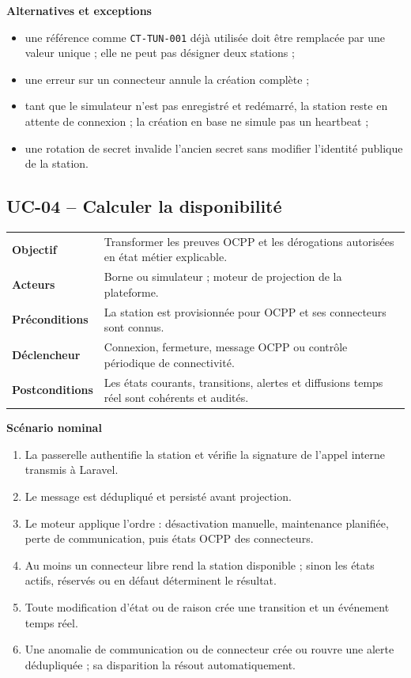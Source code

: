 \textbf{Alternatives et exceptions}
\begin{itemize}[leftmargin=7mm]
  \item une référence comme \texttt{CT-TUN-001} déjà utilisée doit être remplacée par
  une valeur unique ; elle ne peut pas désigner deux stations ;
  \item une erreur sur un connecteur annule la création complète ;
  \item tant que le simulateur n'est pas enregistré et redémarré, la station reste en
  attente de connexion ; la création en base ne simule pas un heartbeat ;
  \item une rotation de secret invalide l'ancien secret sans modifier l'identité
  publique de la station.
\end{itemize}

\subsection{UC-04 -- Calculer la disponibilité}

\begin{table}[H]
  \centering
  \begin{tabularx}{\textwidth}{@{}C{3.3cm}Y@{}}
    \toprule
    \textbf{Objectif} & Transformer les preuves OCPP et les dérogations autorisées en
    état métier explicable.\\
    \textbf{Acteurs} & Borne ou simulateur ; moteur de projection de la plateforme.\\
    \textbf{Préconditions} & La station est provisionnée pour OCPP et ses connecteurs
    sont connus.\\
    \textbf{Déclencheur} & Connexion, fermeture, message OCPP ou contrôle périodique
    de connectivité.\\
    \textbf{Postconditions} & Les états courants, transitions, alertes et diffusions
    temps réel sont cohérents et audités.\\
    \bottomrule
  \end{tabularx}
\end{table}

\textbf{Scénario nominal}
\begin{enumerate}[leftmargin=8mm]
  \item La passerelle authentifie la station et vérifie la signature de l'appel
  interne transmis à Laravel.
  \item Le message est dédupliqué et persisté avant projection.
  \item Le moteur applique l'ordre : désactivation manuelle, maintenance planifiée,
  perte de communication, puis états OCPP des connecteurs.
  \item Au moins un connecteur libre rend la station disponible ; sinon les états
  actifs, réservés ou en défaut déterminent le résultat.
  \item Toute modification d'état ou de raison crée une transition et un événement
  temps réel.
  \item Une anomalie de communication ou de connecteur crée ou rouvre une alerte
  dédupliquée ; sa disparition la résout automatiquement.
\end{enumerate}

